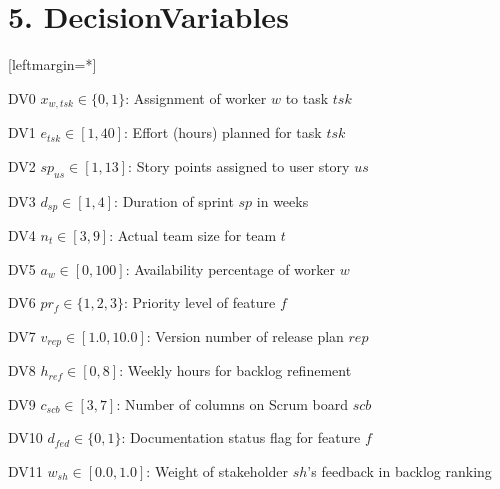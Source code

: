 \documentclass[12pt]{article}
\begin{document}
\section{5. DecisionVariables}
[leftmargin=*]
    \item[DV0] $ x_{w,tsk} \in \{0,1\} $: Assignment of worker $ w $ to task $ tsk $
    \item[DV1] $ e_{tsk} \in [1, 40] $: Effort (hours) planned for task $ tsk $
    \item[DV2] $ sp_{us} \in [1, 13] $: Story points assigned to user story $ us $
    \item[DV3] $ d_{sp} \in [1, 4] $: Duration of sprint $ sp $ in weeks
    \item[DV4] $ n_t \in [3, 9] $: Actual team size for team $ t $
    \item[DV5] $ a_w \in [0, 100] $: Availability percentage of worker $ w $
    \item[DV6] $ pr_f \in \{1,2,3\} $: Priority level of feature $ f $
    \item[DV7] $ v_{rep} \in [1.0, 10.0] $: Version number of release plan $ rep $
    \item[DV8] $ h_{ref} \in [0, 8] $: Weekly hours for backlog refinement
    \item[DV9] $ c_{scb} \in [3, 7] $: Number of columns on Scrum board $ scb $
    \item[DV10] $ d_{fed} \in \{0,1\} $: Documentation status flag for feature $ f $
    \item[DV11] $ w_{sh} \in [0.0, 1.0] $: Weight of stakeholder $ sh $'s feedback in backlog ranking
\end{document}
